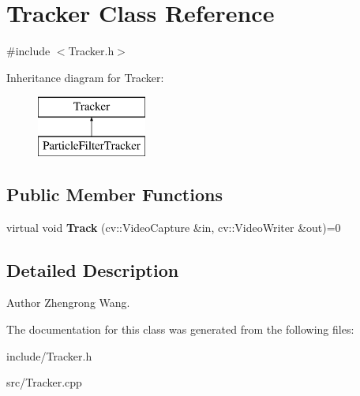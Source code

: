 \hypertarget{classTracker}{}\section{Tracker Class Reference}
\label{classTracker}


{\ttfamily \#include $<$Tracker.\+h$>$}

Inheritance diagram for Tracker\+:\begin{figure}[H]
\begin{center}
\leavevmode
\includegraphics[height=2.000000cm]{classTracker}
\end{center}
\end{figure}
\subsection*{Public Member Functions}
\begin{DoxyCompactItemize}
\item 
\hypertarget{classTracker_a97a7566844820565a36af39560e7b31a}{}virtual void {\bfseries Track} (cv\+::\+Video\+Capture \&in, cv\+::\+Video\+Writer \&out)=0\label{classTracker_a97a7566844820565a36af39560e7b31a}

\end{DoxyCompactItemize}


\subsection{Detailed Description}
\begin{DoxyAuthor}{Author}
Zhengrong Wang. 
\end{DoxyAuthor}


The documentation for this class was generated from the following files\+:\begin{DoxyCompactItemize}
\item 
include/Tracker.\+h\item 
src/Tracker.\+cpp\end{DoxyCompactItemize}
